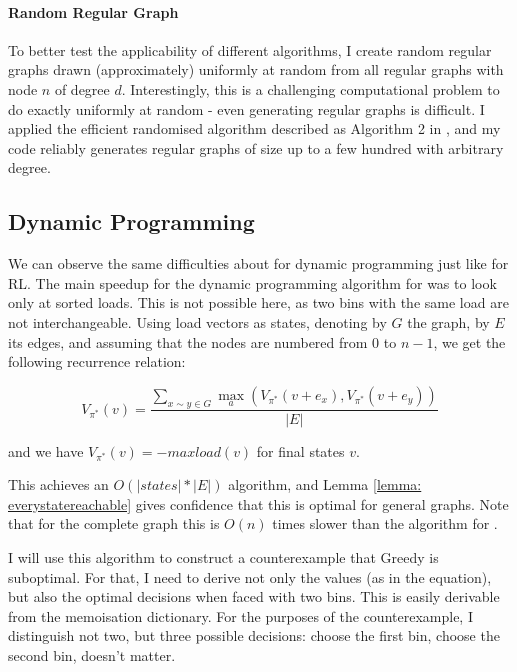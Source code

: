 \paragraph{Random Regular Graph} To better test the applicability of different algorithms, I create random regular graphs drawn (approximately) uniformly at random from all regular graphs with node $n$ of degree $d$. Interestingly, this is a challenging computational problem to do exactly uniformly at random - even generating regular graphs is difficult. I applied the efficient randomised algorithm described as Algorithm 2 in \cite{steger1999randomregulargraphs}, and my code reliably generates regular graphs of size up to a few hundred with arbitrary degree.



\subsection{Dynamic Programming}


We can observe the same difficulties about \GraphicalTwoChoice for dynamic programming just like for RL. The main speedup for the dynamic programming algorithm for \TwoThinning was to look only at sorted loads. This is not possible here, as two bins with the same load are not interchangeable. Using load vectors as states, denoting by $G$ the graph, by $E$ its edges, and assuming that the nodes are numbered from $0$ to $n-1$, we get the following recurrence relation: 


\begin{equation} \label{eq:graphicaltwochoice-dynamicprogramming}
    V_{\pi^*}(v) = \frac{\sum_{x\sim y \in G}\max_a (V_{\pi^*}(v+e_x), V_{\pi^*}(v+e_y))}{|E|}
\end{equation}


and we have $V_{\pi^*}(v)=-maxload(v)$ for final states $v$.

This achieves an $O(|states|*|E|)$ algorithm, and Lemma \ref{lemma: everystatereachable} gives confidence that this is optimal for general graphs. Note that for the complete graph this is $O(n)$ times slower than the algorithm for \TwoThinning.

I will use this algorithm to construct a counterexample that Greedy is suboptimal. For that, I need to derive not only the values (as in the equation), but also the optimal decisions when faced with two bins. This is easily derivable from the memoisation dictionary. For the purposes of the counterexample, I distinguish not two, but three possible decisions: choose the first bin, choose the second bin, doesn't matter.


